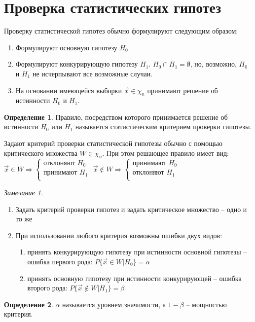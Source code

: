 \documentclass[a4paper, 12pt]{article}
\theoremstyle{definition}
\newtheorem{definition}{Определение}[section]
\theoremstyle{leads}
\theoremstyle{example}
\theoremstyle{remark}
\begin{document}
\section{Проверка статистических гипотез}
	Проверку статистической гипотез обычно формулируют следующим образом:
	\begin{enumerate}
		\item Формулируют основную гипотезу $H_0$
		\item Формулируют конкурирующую гипотезу $H_1$. 
		$H_0 \cap H_1 = \emptyset$, но, возможно, $H_0$ и $H_1$ не исчерпывают все возможные случаи.
		\item На основании имеющейся выборки $\vec{x} \in \chi_n$ принимают решение об истинности $H_0$ и $H_1$.
	\end{enumerate}
	\begin{definition}
		Правило, посредством которого принимается решение об истинности $H_0$ или $H_1$ называется статистическим критерием проверки гипотезы.
	\end{definition}
	
	 Задают критерий проверки статистической гипотезы обычно с помощью критического множества $W \in \chi_n$. При этом решающее правило имеет вид: \newline
	$ \vec {x} \in W \Longrightarrow \left \{
	\begin{array}{ccc}
	\text{отклоняют } H_0\\
	\text{принимают } H_1\\
	\end{array}
	\right.$ \quad
		$ \vec {x} \notin W \Longrightarrow \left \{
	\begin{array}{ccc}
	\text{принимают } H_0\\
	\text{отклоняют } H_1\\
	\end{array}
	\right.$
\newtheorem*{remark1}{Замечание}	
\begin{remark1}
	\begin{enumerate}
		\item Задать критерий проверки гипотез и задать критическое множество -- одно и то же
		\item При использовании любого критерия возможны ошибки двух видов:
		\begin{enumerate}
			\item принять конкурирующую гипотезу при истинности основной гипотезы -- ошибка первого рода: $P\{\vec{x} \in W | H_0\} = \alpha$
			\item принять основную гипотезу при истинности конкурирующей -- ошибка второго рода: $P\{\vec{x} \notin W| H_1\} = \beta$
		\end{enumerate}
	\end{enumerate}
\end{remark1}
\begin{definition}
	$\alpha$ называется уровнем значимости, а $1 - \beta$ -- мощностью критерия.
\end{definition}
\end{document}
